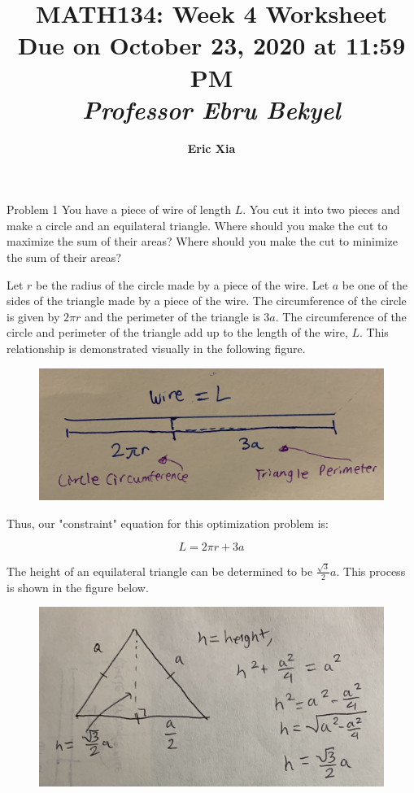 \documentclass{article}
\title{
    \vspace{2in}
    \textmd{\textbf{MATH134: Week 4 Worksheet}}\\
    \normalsize\vspace{0.1in}\small{Due on October 23, 2020 at 11:59 PM}\\
    \vspace{0.1in}\large{\textit{Professor Ebru Bekyel}}
    \vspace{3in}
}
\author{\textbf{Eric Xia}}
\date{}
\begin{document}
    \maketitle
    \pagebreak

    \thispagestyle{2}

    \begin{tbhtheorem}{Problem 1}
        You have a piece of wire of length $L$. You cut it into two pieces and make a circle and an equilateral triangle. Where should you make the cut to maximize the sum of their areas? Where should you make the cut
        to minimize the sum of their areas?
    \end{tbhtheorem}

    Let $r$ be the radius of the circle made by a piece of the wire. Let $a$ be one of the sides of the triangle made by a piece of the wire. The circumference of the circle is given by $2\pi r$ and the perimeter of the
    triangle is $3a$. The circumference of the circle and perimeter of the triangle add up to the length of the wire, $L$. This relationship is demonstrated visually in the following figure.

    \begin{figure}[hbt!]
        \centering
        \includegraphics[scale=0.1]{wire}
    \end{figure}


    Thus, our "constraint" equation for this optimization problem is:

    \[
        L = 2\pi r + 3a
    \]

    The height of an equilateral triangle can be determined to be $\frac{\sqrt{3}}{2}a$. This process is shown in the figure below.
    
    \begin{figure}[hbt!]
        \centering
        \includegraphics[scale=0.1]{triangle}
    \end{figure}
\end{document}
